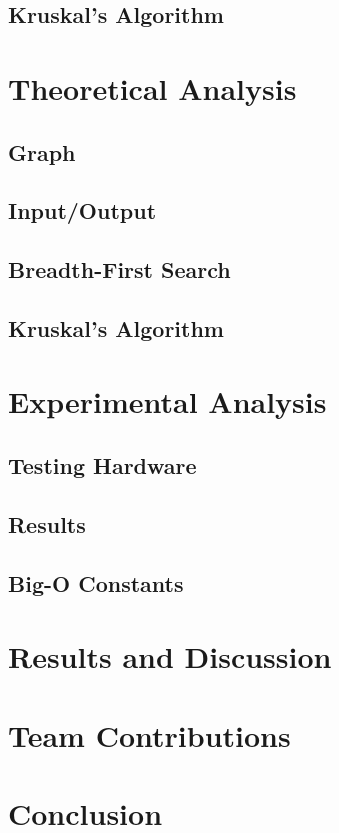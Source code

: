 \documentclass[titlepage]{article}
\begin{document}
\begin{multicols}{2}
			\subsection{Kruskal's Algorithm}

		\section{Theoretical Analysis}
			\subsection{Graph}
			\subsection{Input/Output}
			\subsection{Breadth-First Search}
			\subsection{Kruskal's Algorithm}

		\section{Experimental Analysis}
			\subsection{Testing Hardware}
			\subsection{Results}
			\subsection{Big-O Constants}
		\section{Results and Discussion}
		\section{Team Contributions}
		\section{Conclusion}
	\end{multicols}
\end{document}
